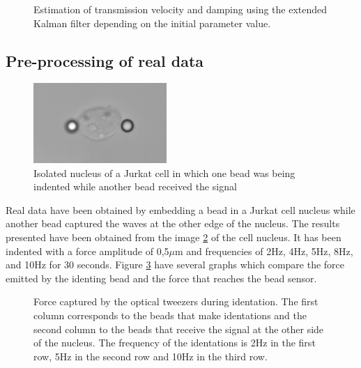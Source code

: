\documentclass[12pt, a4paper]{article} %
\begin{document}
\begin{figure}[h!]
    \centering
    
    \caption{Estimation of  transmission velocity and damping using the extended Kalman filter depending on the initial parameter value.}
    \label{fig:valorescd}
\end{figure}

\newpage
\subsection{Pre-processing of real data}

\setlength{\parskip}{0mm}

\begin{figure}
    \centering
    \includegraphics[width=0.45\textwidth]{figures/recorte_nucleo.png}
    \caption{Isolated nucleus of a Jurkat cell in which one bead was being indented while another bead received the signal}
    \label{fig:myfig3}
\end{figure}

Real data have been obtained by embedding a bead in a Jurkat cell nucleus while another bead captured the waves at the other edge of the nucleus. The results presented have been obtained from the image \ref{fig:myfig3} of the cell nucleus. It has been indented with a force amplitude of 0,5$\mu$m and frequencies of 2Hz, 4Hz, 5Hz, 8Hz, and 10Hz for 30 seconds. Figure \ref{fig:raw_data} have several graphs which compare the force emitted by the identing bead and the force that reaches the bead sensor. \\

\setlength{\parskip}{4mm}

\begin{figure}[htbp]
  \centering
  
  \caption{Force captured by the optical tweezers during identation. The first column corresponds to the beads that make identations and the second column to the beads that receive the signal at the other side of the nucleus. The frequency of the identations is 2Hz in the first row, 5Hz in the second row and 10Hz in the third row.}
  \label{fig:raw_data}
\end{figure}
\end{document}
